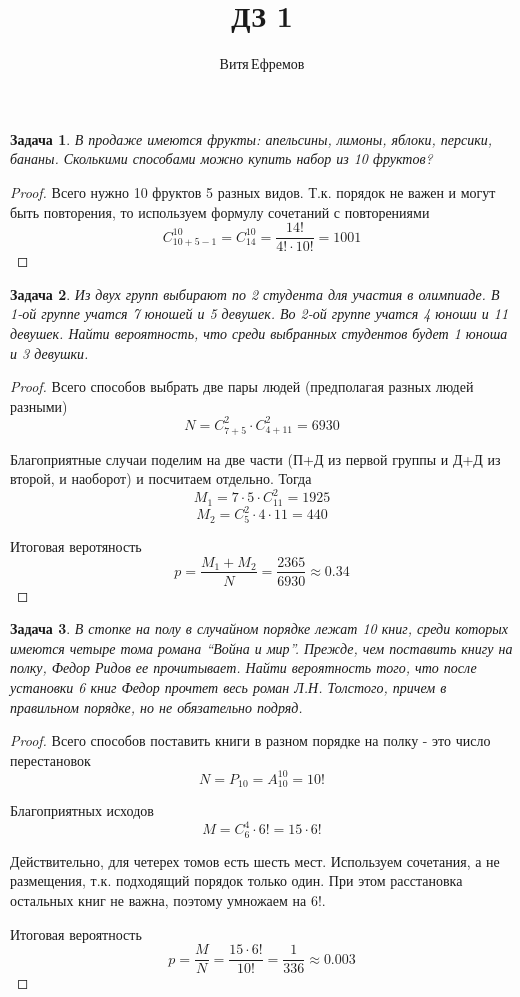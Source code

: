 \documentclass[a4paper,12pt]{article}
\newtheorem{problem}{Задача}
\newenvironment{solution}{\renewcommand{\proofname}{\unskip\indent\nopunct}\begin{proof}}{\end{proof}}
\begin{document}
\title{ДЗ 1}
\author{Витя\,Ефремов}
\maketitle


\begin{problem}
В продаже имеются фрукты: апельсины, лимоны, яблоки, персики, бананы.
Сколькими способами можно купить набор из 10 фруктов?
\end{problem}
\begin{solution}
Всего нужно 10 фруктов 5 разных видов. Т.к. порядок не важен и могут быть повторения, то используем формулу сочетаний с повторениями
$$C_{10+5-1}^{10} = C_{14}^{10} = \frac{14!}{4! \cdot 10!} = 1001$$
\end{solution}


\begin{problem}
Из двух групп выбирают по 2 студента для участия в олимпиаде. В 1-ой группе учатся 7 юношей и 5 девушек. Во 2-ой группе учатся 4 юноши и 11 девушек. Найти вероятность, что среди выбранных студентов будет 1 юноша и 3 девушки.
\end{problem}
\begin{solution}
Всего способов выбрать две пары людей (предполагая разных людей разными)
$$N = C_{7+5}^2 \cdot C_{4+11}^2 = 6930$$

Благоприятные случаи поделим на две части (П+Д из первой группы и Д+Д из второй, и наоборот) и посчитаем отдельно. Тогда
$$M_1 = 7 \cdot 5 \cdot C_{11}^2 = 1925$$
$$M_2 = C_5^2 \cdot 4 \cdot 11 = 440$$

Итоговая веротяность
$$p = \frac{M_1 + M_2}{N} = \frac{2365}{6930} \approx 0.34$$
\end{solution}


\begin{problem}
В стопке на полу в случайном порядке лежат 10 книг, среди которых имеются четыре тома романа “Война и мир”. Прежде, чем поставить книгу на полку, Федор Ридов ее прочитывает. Найти вероятность того, что после установки 6 книг Федор прочтет весь роман Л.Н. Толстого, причем в правильном порядке, но не обязательно подряд.
\end{problem}
\begin{solution}
Всего способов поставить книги в разном порядке на полку - это число перестановок
$$N = P_{10} = A_{10}^{10} = 10!$$

Благоприятных исходов
$$M = C_6^4 \cdot 6! = 15 \cdot 6!$$

Действительно, для четерех томов есть шесть мест. Используем сочетания, а не размещения, т.к. подходящий порядок только один. При этом расстановка остальных книг не важна, поэтому умножаем на $6!$.

Итоговая вероятность
$$p = \frac{M}{N} = \frac{15 \cdot 6!}{10!} = \frac{1}{336} \approx 0.003$$
\end{solution}
\end{document}
